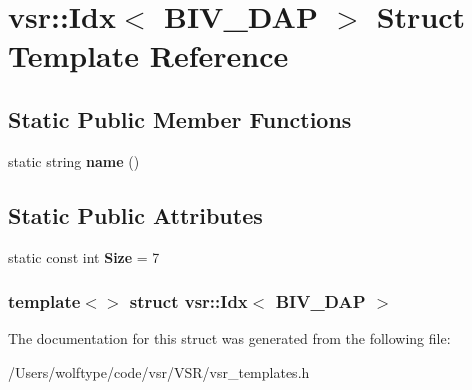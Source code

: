 \hypertarget{structvsr_1_1_idx_3_01_b_i_v___d_a_p_01_4}{\section{vsr\-:\-:Idx$<$ B\-I\-V\-\_\-\-D\-A\-P $>$ Struct Template Reference}
\label{structvsr_1_1_idx_3_01_b_i_v___d_a_p_01_4}
}
\subsection*{Static Public Member Functions}
\begin{DoxyCompactItemize}
\item 
\hypertarget{structvsr_1_1_idx_3_01_b_i_v___d_a_p_01_4_a82b77ffd935adb12e4d51d390c03d1eb}{static string {\bfseries name} ()}\label{structvsr_1_1_idx_3_01_b_i_v___d_a_p_01_4_a82b77ffd935adb12e4d51d390c03d1eb}

\end{DoxyCompactItemize}
\subsection*{Static Public Attributes}
\begin{DoxyCompactItemize}
\item 
\hypertarget{structvsr_1_1_idx_3_01_b_i_v___d_a_p_01_4_a546405c1ceed14ec36a62f6789fde46c}{static const int {\bfseries Size} = 7}\label{structvsr_1_1_idx_3_01_b_i_v___d_a_p_01_4_a546405c1ceed14ec36a62f6789fde46c}

\end{DoxyCompactItemize}
\subsubsection*{template$<$$>$ struct vsr\-::\-Idx$<$ B\-I\-V\-\_\-\-D\-A\-P $>$}



The documentation for this struct was generated from the following file\-:\begin{DoxyCompactItemize}
\item 
/\-Users/wolftype/code/vsr/\-V\-S\-R/vsr\-\_\-templates.\-h\end{DoxyCompactItemize}
